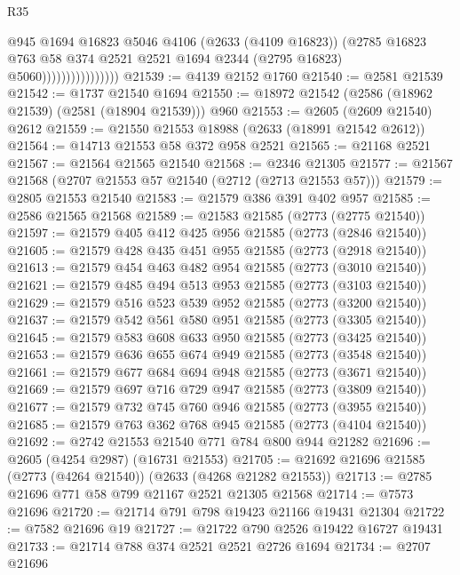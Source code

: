 \begin{lexlean}{R35}
\begin{coremodule}
                                  @945
                                  @1694
                                  @16823
                                  @5046
                                  @4106
                                  (@2633 (@4109 @16823))
                                  (@2785
                                    @16823
                                    @763
                                    @58
                                    @374
                                    @2521
                                    @2521
                                    @1694
                                    @2344
                                    (@2795 @16823)
                                    @5060))))))))))))))))
@21539 := @4139 @2152 @1760
@21540 := @2581 @21539
@21542 := @1737 @21540 @1694
@21550 := @18972 @21542 (@2586 (@18962 @21539) (@2581 (@18904 @21539))) @960
@21553 := @2605 (@2609 @21540) @2612
@21559 := @21550 @21553 @18988 (@2633 (@18991 @21542 @2612))
@21564 := @14713 @21553 @58 @372 @958 @2521
@21565 := @21168 @2521
@21567 := @21564 @21565 @21540
@21568 := @2346 @21305
@21577 := @21567 @21568 (@2707 @21553 @57 @21540 (@2712 (@2713 @21553 @57)))
@21579 := @2805 @21553 @21540
@21583 := @21579 @386 @391 @402 @957
@21585 := @2586 @21565 @21568
@21589 := @21583 @21585 (@2773 (@2775 @21540))
@21597 := @21579 @405 @412 @425 @956 @21585 (@2773 (@2846 @21540))
@21605 := @21579 @428 @435 @451 @955 @21585 (@2773 (@2918 @21540))
@21613 := @21579 @454 @463 @482 @954 @21585 (@2773 (@3010 @21540))
@21621 := @21579 @485 @494 @513 @953 @21585 (@2773 (@3103 @21540))
@21629 := @21579 @516 @523 @539 @952 @21585 (@2773 (@3200 @21540))
@21637 := @21579 @542 @561 @580 @951 @21585 (@2773 (@3305 @21540))
@21645 := @21579 @583 @608 @633 @950 @21585 (@2773 (@3425 @21540))
@21653 := @21579 @636 @655 @674 @949 @21585 (@2773 (@3548 @21540))
@21661 := @21579 @677 @684 @694 @948 @21585 (@2773 (@3671 @21540))
@21669 := @21579 @697 @716 @729 @947 @21585 (@2773 (@3809 @21540))
@21677 := @21579 @732 @745 @760 @946 @21585 (@2773 (@3955 @21540))
@21685 := @21579 @763 @362 @768 @945 @21585 (@2773 (@4104 @21540))
@21692 := @2742 @21553 @21540 @771 @784 @800 @944 @21282
@21696 := @2605 (@4254 @2987) (@16731 @21553)
@21705 := @21692 @21696 @21585 (@2773 (@4264 @21540)) (@2633 (@4268 @21282 @21553))
@21713 := @2785 @21696 @771 @58 @799 @21167 @2521 @21305 @21568
@21714 := @7573 @21696
@21720 := @21714 @791 @798 @19423 @21166 @19431 @21304
@21722 := @7582 @21696 @19
@21727 := @21722 @790 @2526 @19422 @16727 @19431
@21733 := @21714 @788 @374 @2521 @2521 @2726 @1694
@21734 := @2707 @21696

\end{coremodule}
\end{lexlean}
